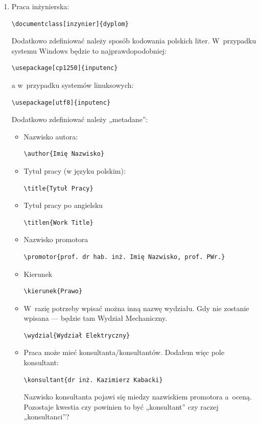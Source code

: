 \begin{enumerate}
\begin{verbatim}
\end{verbatim}
\item
Praca inżynierska:
\begin{verbatim}
\documentclass[inzynier]{dyplom}
\end{verbatim}
Dodatkowo zdefiniować należy sposób kodowania polskich liter. W~przypadku systemu Windows będzie to najprawdopodobniej:
\begin{verbatim}
\usepackage[cp1250]{inputenc}
\end{verbatim}
a w~przypadku systemów linuksowych:
\begin{verbatim}
\usepackage[utf8]{inputenc}
\end{verbatim}

Dodatkowo zdefiniować należy „metadane”:
\begin{itemize}
\item
Nazwisko autora:
\begin{verbatim}
\author{Imię Nazwisko}
\end{verbatim}
\item
Tytuł pracy (w języku polskim):
\begin{verbatim}
\title{Tytuł Pracy}
\end{verbatim}
\item
Tytuł pracy po angielsku
\begin{verbatim}
\titlen{Work Title}
\end{verbatim}
\item
Nazwisko promotora
\begin{verbatim}
\promotor{prof. dr hab. inż. Imię Nazwisko, prof. PWr.}
\end{verbatim}
\item
Kierunek
\begin{verbatim}
\kierunek{Prawo}
\end{verbatim}
\item
W~razię potrzeby wpisać można inną nazwę wydziału. Gdy nie zostanie wpisana — będzie tam Wydział Mechaniczny.
\begin{verbatim}
\wydzial{Wydział Elektryczny}
\end{verbatim}
\item
Praca może mieć konsultanta/konsultantów. Dodałem więc pole konsultant:
\begin{verbatim}
\konsultant{dr inż. Kazimierz Kabacki}
\end{verbatim}
Nazwisko konsultanta pojawi się miedzy nazwiskiem promotora a~oceną. Pozostaje kwestia czy powinien to być „konsultant” czy raczej „konsultanci”?


\end{itemize}
\end{enumerate}
